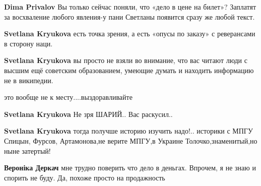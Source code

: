 \begin{itemize}
\begin{itemize}
\textbf{Dima Privalov} Вы только сейчас поняли, что «дело в цене на билет»? Заплатят за восхваление любого явления-у пани Светланы появится сразу же любой текст.

 
\textbf{Svetlana Kryukova} есть точка зрения, а есть «опусы по заказу» с реверансами в сторону наци.

 
\textbf{Svetlana Kryukova} вы просто не взяли во внимание, что вас читают люди с высшим ещё советским образованием, умеющие думать и находить информацию не в википедии.

 
это вообще не к месту....выздоравливайте

 
\textbf{Svetlana Kryukova} Не зря ШАРИЙ..
Вас раскусил..

 
\textbf{Svetlana Kryukova} тогда получше историю изучить надо!.. историки с МПГУ Спицын, Фурсов, Артамонова,не верите МПГУ,в Украине Толочко,знаменитый,но ныне затертый!

 
\textbf{Вероніка Деркач} мне трудно поверить что дело в деньгах. Впрочем, я не знаю и спорить не буду. Да, похоже просто на продажность


\end{itemize}
\end{itemize}
